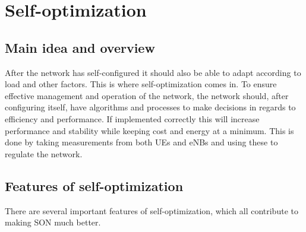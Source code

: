 \documentclass{report}
\begin{document}
\chapter{Self-optimization}
\section{Main idea and overview}
After the network has self-configured it should also be able to adapt according to load and other factors. This is where self-optimization comes in. To ensure effective management and operation of the network, the network should, after configuring itself, have algorithms and processes to make decisions in regards to efficiency and performance. If implemented correctly this will increase performance and stability while keeping cost and energy at a minimum. This is done by taking measurements from both UEs and eNBs and using these to regulate the network. 

\section{Features of self-optimization}
There are several important features of self-optimization, which all contribute to making SON much better. 
\end{document}
